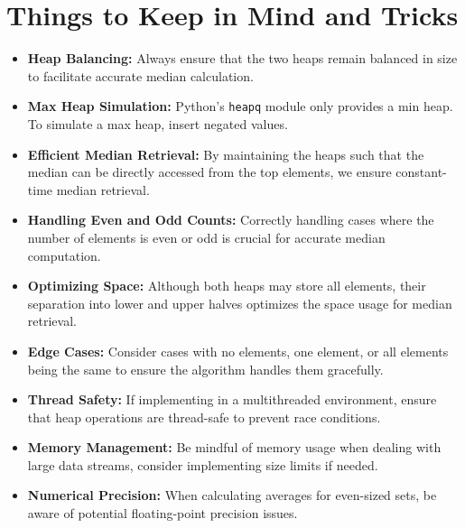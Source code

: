 \section*{Things to Keep in Mind and Tricks}

\begin{itemize}
    \item \textbf{Heap Balancing:} Always ensure that the two heaps remain balanced in size to facilitate accurate median calculation.
    
    \item \textbf{Max Heap Simulation:} Python's \texttt{heapq} module only provides a min heap. To simulate a max heap, insert negated values.
    
    \item \textbf{Efficient Median Retrieval:} By maintaining the heaps such that the median can be directly accessed from the top elements, we ensure constant-time median retrieval.
    
    \item \textbf{Handling Even and Odd Counts:} Correctly handling cases where the number of elements is even or odd is crucial for accurate median computation.
    
    \item \textbf{Optimizing Space:} Although both heaps may store all elements, their separation into lower and upper halves optimizes the space usage for median retrieval.
    
    \item \textbf{Edge Cases:} Consider cases with no elements, one element, or all elements being the same to ensure the algorithm handles them gracefully.
    
    \item \textbf{Thread Safety:} If implementing in a multithreaded environment, ensure that heap operations are thread-safe to prevent race conditions.
    
    \item \textbf{Memory Management:} Be mindful of memory usage when dealing with large data streams, consider implementing size limits if needed.
    
    \item \textbf{Numerical Precision:} When calculating averages for even-sized sets, be aware of potential floating-point precision issues.
\end{itemize}

